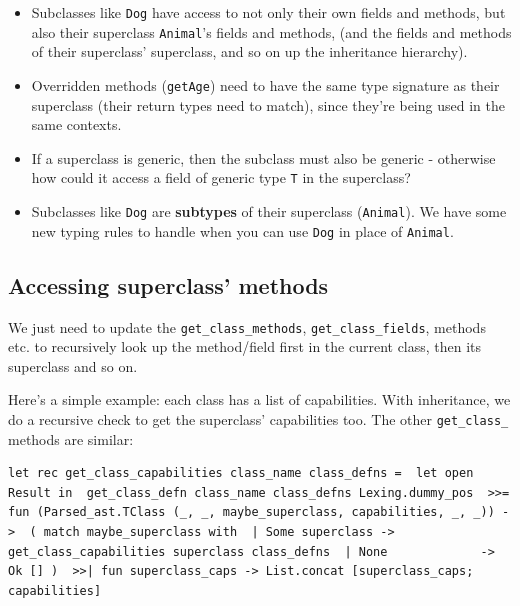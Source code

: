 \begin{itemize}
\tightlist
\item
  Subclasses like \texttt{Dog} have access to not only their own fields
  and methods, but also their superclass \texttt{Animal}'s fields and
  methods, (and the fields and methods of their superclass' superclass,
  and so on up the inheritance hierarchy).
\item
  Overridden methods (\texttt{getAge}) need to have the same type
  signature as their superclass (their return types need to match),
  since they're being used in the same contexts.
\item
  If a superclass is generic, then the subclass must also be generic -
  otherwise how could it access a field of generic type \texttt{T} in
  the superclass?
\item
  Subclasses like \texttt{Dog} are \textbf{subtypes} of their superclass
  (\texttt{Animal}). We have some new typing rules to handle when you
  can use \texttt{Dog} in place of \texttt{Animal}.
\end{itemize}

\hypertarget{accessing-superclass-methods}{%
\subsection{\texorpdfstring{\protect\hyperlink{accessing-superclass-methods}{}Accessing
superclass'
methods}{Accessing superclass' methods}}\label{accessing-superclass-methods}}

We just need to update the \texttt{get\_class\_methods},
\texttt{get\_class\_fields}, methods etc. to recursively look up the
method/field first in the current class, then its superclass and so on.

Here's a simple example: each class has a list of capabilities. With
inheritance, we do a recursive check to get the superclass' capabilities
too. The other \texttt{get\_class\_} methods are similar:

%

\begin{lstlisting}[language=caml,caption={type\_env.ml}]
let rec get_class_capabilities class_name class_defns =  let open Result in  get_class_defn class_name class_defns Lexing.dummy_pos  >>= fun (Parsed_ast.TClass (_, _, maybe_superclass, capabilities, _, _)) ->  ( match maybe_superclass with  | Some superclass -> get_class_capabilities superclass class_defns  | None             -> Ok [] )  >>| fun superclass_caps -> List.concat [superclass_caps; capabilities]
\end{lstlisting}

